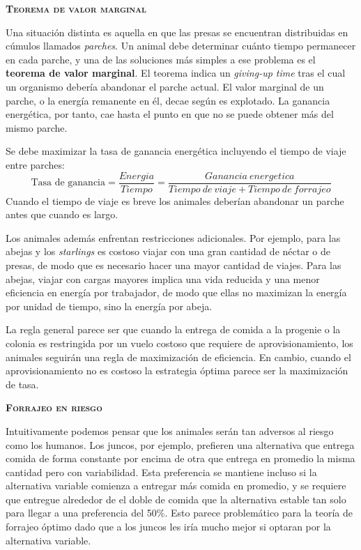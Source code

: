 \documentclass[a4paper,12pt]{article}
\begin{document}
{\scshape\bfseries Teorema de valor marginal}

Una situación distinta es aquella en que las presas se encuentran distribuidas en cúmulos llamados {\itshape parches}. Un animal debe determinar cuánto tiempo permanecer en cada parche, y una de las soluciones más simples a ese problema es el {\bfseries teorema de valor marginal}. El teorema indica un {\itshape giving-up time} tras el cual un organismo debería abandonar el parche actual. El valor marginal de un parche, o la energía remanente en él, decae según es explotado. La ganancia energética, por tanto, cae hasta el punto en que no se puede obtener más del mismo parche.

Se debe maximizar la tasa de ganancia energética incluyendo el tiempo de viaje entre parches:
\[
    \mbox{Tasa de ganancia} = \frac{Energia}{Tiempo} = 
    \frac{
        Ganancia\ energetica
    }{
        Tiempo\ de\ viaje + Tiempo\ de\ forrajeo
    }
\]
Cuando el tiempo de viaje es breve los animales deberían abandonar un parche antes que cuando es largo.

Los animales además enfrentan restricciones adicionales. Por ejemplo, para las abejas y los {\itshape starlings} es costoso viajar con una gran cantidad de néctar o de presas, de modo que es necesario hacer una mayor cantidad de viajes. Para las abejas, viajar con cargas mayores implica una vida reducida y una menor eficiencia en energía por trabajador, de modo que ellas no maximizan la energía por unidad de tiempo, sino la energía por abeja.

La regla general parece ser que cuando la entrega de comida a la progenie o la colonia es restringida por un vuelo costoso que requiere de aprovisionamiento, los animales seguirán una regla de maximización de eficiencia. En cambio, cuando el aprovisionamiento no es costoso la estrategia óptima parece ser la maximización de tasa.

{\scshape\bfseries Forrajeo en riesgo}

Intuitivamente podemos pensar que los animales serán tan adversos al riesgo como los humanos. Los juncos, por ejemplo, prefieren una alternativa que entrega comida de forma constante por encima de otra que entrega en promedio la misma cantidad pero con variabilidad. Esta preferencia se mantiene incluso si la alternativa variable comienza a entregar más comida en promedio, y se requiere que entregue alrededor de el doble de comida que la alternativa estable tan solo para llegar a una preferencia del 50\%. Esto parece problemático para la teoría de forrajeo óptimo dado que a los juncos les iría mucho mejor si optaran por la alternativa variable.
\end{document}
